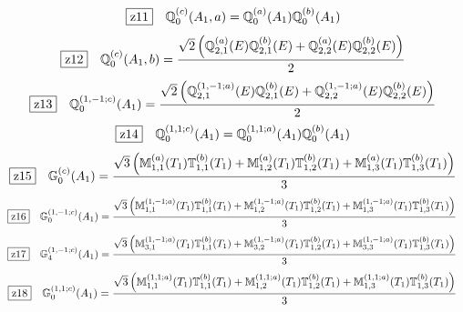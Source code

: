\documentclass[fleqn,10pt,landscape]{jsarticle}
\begin{document}
\begin{dmath*}
\hspace*{3mm}\fbox{z11}\quad \mathbb{Q}_{0}^{(c)}(A_{1},a)=\mathbb{Q}_{0}^{(a)}(A_{1}) \mathbb{Q}_{0}^{(b)}(A_{1})
\end{dmath*}
\begin{dmath*}
\hspace*{3mm}\fbox{z12}\quad \mathbb{Q}_{0}^{(c)}(A_{1},b)=\frac{\sqrt{2} \left(\mathbb{Q}_{2,1}^{(a)}(E) \mathbb{Q}_{2,1}^{(b)}(E) + \mathbb{Q}_{2,2}^{(a)}(E) \mathbb{Q}_{2,2}^{(b)}(E)\right)}{2}
\end{dmath*}
\begin{dmath*}
\hspace*{3mm}\fbox{z13}\quad \mathbb{Q}_{0}^{(1,-1;c)}(A_{1})=\frac{\sqrt{2} \left(\mathbb{Q}_{2,1}^{(1,-1;a)}(E) \mathbb{Q}_{2,1}^{(b)}(E) + \mathbb{Q}_{2,2}^{(1,-1;a)}(E) \mathbb{Q}_{2,2}^{(b)}(E)\right)}{2}
\end{dmath*}
\begin{dmath*}
\hspace*{3mm}\fbox{z14}\quad \mathbb{Q}_{0}^{(1,1;c)}(A_{1})=\mathbb{Q}_{0}^{(1,1;a)}(A_{1}) \mathbb{Q}_{0}^{(b)}(A_{1})
\end{dmath*}
\begin{dmath*}
\hspace*{3mm}\fbox{z15}\quad \mathbb{G}_{0}^{(c)}(A_{1})=\frac{\sqrt{3} \left(\mathbb{M}_{1,1}^{(a)}(T_{1}) \mathbb{T}_{1,1}^{(b)}(T_{1}) + \mathbb{M}_{1,2}^{(a)}(T_{1}) \mathbb{T}_{1,2}^{(b)}(T_{1}) + \mathbb{M}_{1,3}^{(a)}(T_{1}) \mathbb{T}_{1,3}^{(b)}(T_{1})\right)}{3}
\end{dmath*}
\begin{dmath*}
\hspace*{3mm}\fbox{z16}\quad \mathbb{G}_{0}^{(1,-1;c)}(A_{1})=\frac{\sqrt{3} \left(\mathbb{M}_{1,1}^{(1,-1;a)}(T_{1}) \mathbb{T}_{1,1}^{(b)}(T_{1}) + \mathbb{M}_{1,2}^{(1,-1;a)}(T_{1}) \mathbb{T}_{1,2}^{(b)}(T_{1}) + \mathbb{M}_{1,3}^{(1,-1;a)}(T_{1}) \mathbb{T}_{1,3}^{(b)}(T_{1})\right)}{3}
\end{dmath*}
\begin{dmath*}
\hspace*{3mm}\fbox{z17}\quad \mathbb{G}_{4}^{(1,-1;c)}(A_{1})=\frac{\sqrt{3} \left(\mathbb{M}_{3,1}^{(1,-1;a)}(T_{1}) \mathbb{T}_{1,1}^{(b)}(T_{1}) + \mathbb{M}_{3,2}^{(1,-1;a)}(T_{1}) \mathbb{T}_{1,2}^{(b)}(T_{1}) + \mathbb{M}_{3,3}^{(1,-1;a)}(T_{1}) \mathbb{T}_{1,3}^{(b)}(T_{1})\right)}{3}
\end{dmath*}
\begin{dmath*}
\hspace*{3mm}\fbox{z18}\quad \mathbb{G}_{0}^{(1,1;c)}(A_{1})=\frac{\sqrt{3} \left(\mathbb{M}_{1,1}^{(1,1;a)}(T_{1}) \mathbb{T}_{1,1}^{(b)}(T_{1}) + \mathbb{M}_{1,2}^{(1,1;a)}(T_{1}) \mathbb{T}_{1,2}^{(b)}(T_{1}) + \mathbb{M}_{1,3}^{(1,1;a)}(T_{1}) \mathbb{T}_{1,3}^{(b)}(T_{1})\right)}{3}
\end{dmath*}
\end{document}
